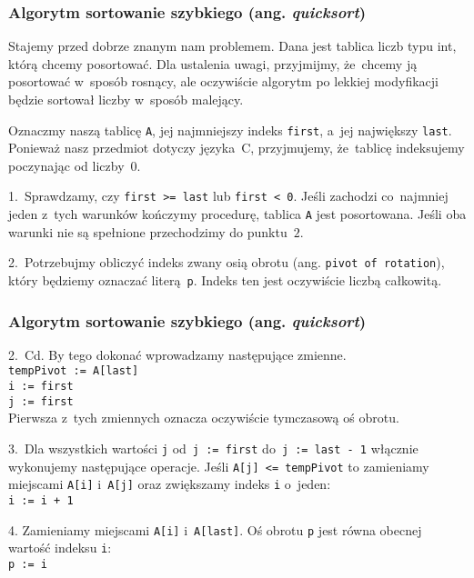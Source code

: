 \documentclass[10pt,t]{beamer}
\begin{document}
\begin{frame}
  \frametitle{Algorytm sortowanie szybkiego (ang.
    \textit{quicksort})}


  Stajemy przed dobrze znanym nam problemem. Dana jest tablica liczb typu
  int, którą chcemy posortować. Dla ustalenia uwagi, przyjmijmy, że~chcemy
  ją posortować w~sposób rosnący, ale oczywiście algorytm po lekkiej
  modyfikacji będzie sortował liczby w~sposób malejący.

  Oznaczmy naszą tablicę \texttt{A}, jej najmniejszy indeks \texttt{first},
  a~jej największy \texttt{last}. Ponieważ nasz przedmiot dotyczy języka~C,
  przyjmujemy, że~tablicę indeksujemy poczynając od liczby~$0$.

  1.~Sprawdzamy, czy \texttt{first >= last} lub \texttt{first < 0}. Jeśli
  zachodzi co~najmniej jeden z~tych warunków kończymy procedurę, tablica
  \texttt{A} jest posortowana. Jeśli oba warunki nie są spełnione
  przechodzimy do punktu~$2$.

  2.~Potrzebujmy obliczyć indeks zwany osią obrotu (ang. \texttt{pivot~of
    rotation}), który będziemy oznaczać literą~\texttt{p}. Indeks ten jest
  oczywiście liczbą całkowitą.

\end{frame}





\begin{frame}
  \frametitle{Algorytm sortowanie szybkiego (ang.
    \textit{quicksort})}


  2.~Cd. By tego dokonać wprowadzamy następujące zmienne. \\
  \texttt{tempPivot := A[last]} \\
  \texttt{i := first} \\
  \texttt{j := first} \\
  Pierwsza z~tych zmiennych oznacza oczywiście tymczasową oś obrotu.

  3.~Dla wszystkich wartości \texttt{j} od~\texttt{j := first}
  do~\texttt{j := last - 1} włącznie wykonujemy następujące operacje.
  Jeśli \texttt{A[j] <= tempPivot} to zamieniamy miejscami \texttt{A[i]}
  i~\texttt{A[j]} oraz zwiększamy indeks \texttt{i} o~jeden: \\
  \texttt{i := i + 1}

  4. Zamieniamy miejscami \texttt{A[i]} i~\texttt{A[last]}. Oś obrotu
  \texttt{p} jest równa obecnej wartość indeksu \texttt{i}: \\
  \texttt{p := i}

\end{frame}
\end{document}
